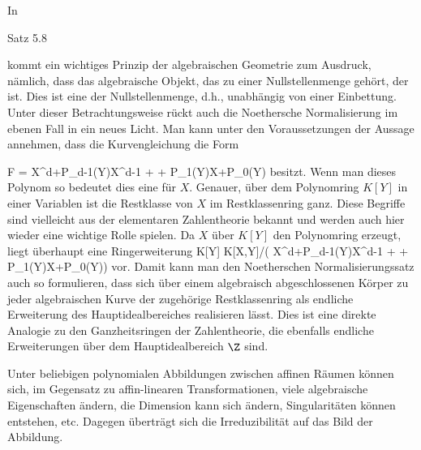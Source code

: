 {}
{





In

Satz 5.8

kommt ein wichtiges Prinzip der algebraischen Geometrie zum Ausdruck, nämlich, dass das algebraische Objekt, das zu einer Nullstellenmenge gehört, der  {} ist. Dies ist eine  der Nullstellenmenge, d.h., unabhängig von einer Einbettung. Unter dieser Betrachtungsweise rückt auch die Noethersche Normalisierung im ebenen Fall in ein neues Licht. Man kann unter den Voraussetzungen der Aussage annehmen, dass die Kurvengleichung die Form

\mavergleichskettedisp
{\vergleichskette
{ F
}
{ =} { X^d+P_{d-1}(Y)X^{d-1}  + \cdots + P_1(Y)X+P_0(Y)
}
{ } {
}
{ } {
}
{ } {
}
}
{}{}{}
besitzt. Wenn man dieses Polynom  so bedeutet dies eine  {} für $X$. Genauer, über dem Polynomring $K[Y]$ in einer Variablen ist die Restklasse von $X$ im Restklassenring
 ganz. Diese Begriffe sind vielleicht aus der elementaren Zahlentheorie bekannt und werden auch hier wieder eine wichtige Rolle spielen. Da $X$ über $K[Y]$ den Polynomring erzeugt, liegt überhaupt eine  {}
 {} {}
Ringerweiterung
\maabbdisp {} { K[Y] } { K[X,Y]/( X^d+P_{d-1}(Y)X^{d-1}  + \cdots +  P_1(Y)X+P_0(Y))
} {}
vor. Damit kann man den Noetherschen Normalisierungssatz auch so formulieren, dass sich über einem algebraisch abgeschlossenen Körper zu jeder algebraischen Kurve der zugehörige Restklassenring als endliche Erweiterung des Hauptidealbereiches
 realisieren lässt. Dies ist eine direkte Analogie zu den Ganzheitsringen der Zahlentheorie, die ebenfalls endliche Erweiterungen über dem Hauptidealbereich $\Z$ sind.





}

Unter beliebigen polynomialen Abbildungen zwischen affinen Räumen können sich, im Gegensatz zu affin-linearen Transformationen, viele algebraische Eigenschaften ändern, die Dimension kann sich ändern, Singularitäten können entstehen, etc. Dagegen überträgt sich die Irreduzibilität auf
 {} {}
das Bild der Abbildung.





